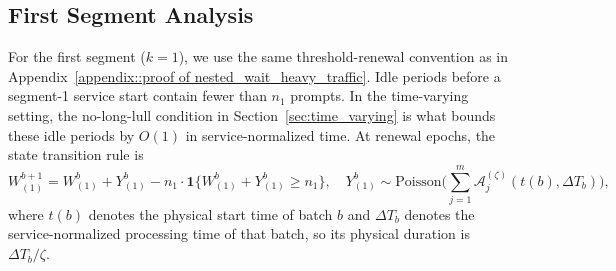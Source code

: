 \subsection{First Segment Analysis}

For the first segment ($k=1$), we use the same threshold-renewal convention as in Appendix~\ref{appendix::proof of nested_wait_heavy_traffic}. Idle periods before a segment-1 service start contain fewer than \(n_1\) prompts. In the time-varying setting, the no-long-lull condition in Section~\ref{sec:time_varying} is what bounds these idle periods by \(O(1)\) in service-normalized time. At renewal epochs, the state transition rule is
$$ W_{(1)}^{b+1} = W_{(1)}^{b} + Y_{(1)}^b  - n_1 \cdot \mathbf{1}\{ W_{(1)}^{b} + Y_{(1)}^b \geq n_1 \},  \quad Y_{(1)}^b \sim \text{Poisson}\Big( \sum_{j=1}^m \mathcal A_j^{(\zeta)}(t(b),\Delta T_b) \Big),  $$
where $t(b)$ denotes the physical start time of batch $b$ and $\Delta T_b$ denotes the service-normalized processing time of that batch, so its physical duration is \(\Delta T_b/\zeta\).


